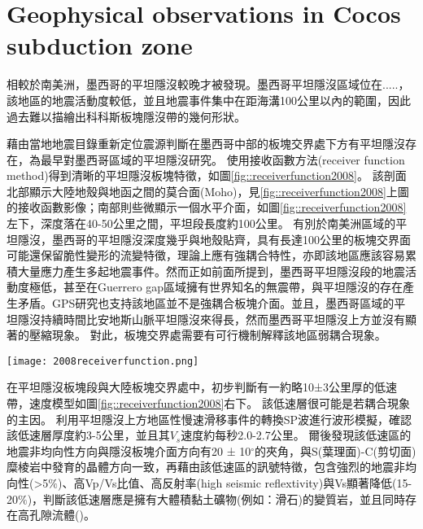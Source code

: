 \section{Geophysical observations in Cocos subduction zone}
相較於南美洲，墨西哥的平坦隱沒較晚才被發現。墨西哥平坦隱沒區域位在.....，該地區的地震活動度較低，並且地震事件集中在距海溝100公里以內的範圍，因此過去難以描繪出科科斯板塊隱沒帶的幾何形狀。

\citealp{pardo1995}藉由當地地震目錄重新定位震源判斷在墨西哥中部的板塊交界處下方有平坦隱沒存在，為最早對墨西哥區域的平坦隱沒研究。
\citealp{PerezCampos2008}使用接收函數方法(receiver function method)得到清晰的平坦隱沒板塊特徵，如圖\ref{fig::receiverfunction2008}。
該剖面北部顯示大陸地殼與地函之間的莫合面(Moho)，見\ref{fig::receiverfunction2008}上圖的接收函數影像；南部則些微顯示一個水平介面，如圖\ref{fig::receiverfunction2008}左下，深度落在40-50公里之間，平坦段長度約100公里。
有別於南美洲區域的平坦隱沒，墨西哥的平坦隱沒深度幾乎與地殼貼齊，具有長達100公里的板塊交界面可能還保留脆性變形的流變特徵，理論上應有強耦合特性，亦即該地區應該容易累積大量應力產生多起地震事件。然而正如前面所提到，墨西哥平坦隱沒段的地震活動度極低，甚至在Guerrero gap區域擁有世界知名的無震帶，與平坦隱沒的存在產生矛盾。GPS研究也支持該地區並不是強耦合板塊介面。並且，墨西哥區域的平坦隱沒持續時間比安地斯山脈平坦隱沒來得長，然而墨西哥平坦隱沒上方並沒有顯著的壓縮現象。
對此，板塊交界處需要有可行機制解釋該地區弱耦合現象。

\begin{figure*}[ht!]
    \centering
    \texttt{[image: 2008receiverfunction.png]}
    \caption{墨西哥平坦隱沒區域接收函數結果，摘自\citealp{PerezCampos2008}。上圖：黑色三角形表示測站沿剖面的位置，高程被放大10倍。粗棕色線表示跨墨西哥火山帶(TMVB, Trans-Mexican Volcanic Belt)的範圍。上圖接收函數影像中標出沿剖面50公里範圍內的震源(粉紅色點來自SSN地震目錄；綠色點來自\citealp{pardo1995}重新定位結果)位置。下方左圖：顯示沿平坦隱沒板塊的一次遠震事件的接收函數。下方中間圖:說明了相應的模型（LVM(low velocity mantle) = 低速地函和 OC(oceanic crust) = 海洋地殼）。下方右圖：根據左下圖接收函數模型中A、B和C位置上的P波速度模型。
    }
    \label{fig::receiverfunction2008}
\end{figure*}

\citealp{PerezCampos2008}在平坦隱沒板塊段與大陸板塊交界處中，初步判斷有一約略10±3公里厚的低速帶，速度模型如圖\ref{fig::receiverfunction2008}右下。
該低速層很可能是若耦合現象的主因。
\citealp{Song2009}利用平坦隱沒上方地區性慢速滑移事件的轉換SP波進行波形模擬，確認該低速層厚度約3-5公里，並且其$V_s$速度約每秒2.0-2.7公里。
爾後\citealp{Song2012SC}發現該低速區的地震非均向性方向與隱沒板塊介面方向有20 ± 10$^{\circ}$的夾角，與S(葉理面)-C(剪切面)糜棱岩中發育的晶體方向一致，再藉由該低速區的訊號特徵，包含強烈的地震非均向性(>5$\%$)、高Vp/Vs比值、高反射率(high seismic reflextivity)與Vs顯著降低(15-20$\%$)，判斷該低速層應是擁有大體積黏土礦物(例如：滑石)的變質岩，並且同時存在高孔隙流體(\citealp{Kim2012})。

